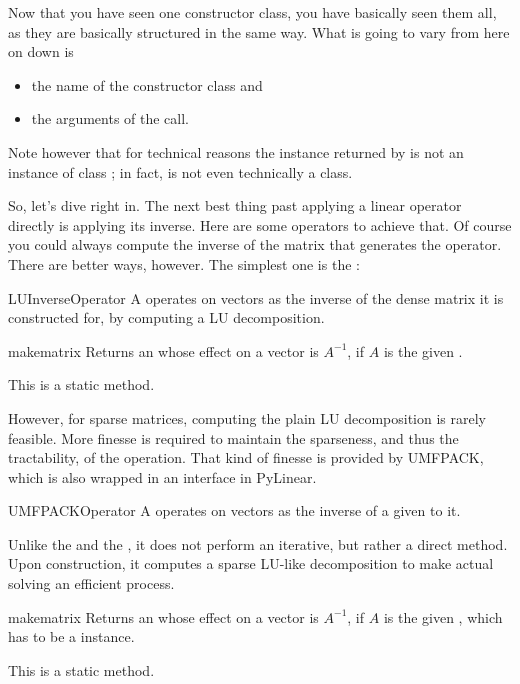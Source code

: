 Now that you have seen one constructor class, you have basically
seen them all, as they are basically structured in the same way.
What is going to vary from here on down is
\begin{itemize}
\item the name of the constructor class and
\item the arguments of the  call.
\end{itemize}
Note however that for technical reasons the instance returned by
 is not an instance of class ; 
in fact,  is not even technically a class.

So, let's dive right in. The next best thing past applying a linear
operator directly is applying its inverse. Here are some operators to
achieve that. Of course you could always compute the inverse of the
matrix that generates the operator. There are better ways,
however. The simplest one is the :
\begin{classdesc*}{LUInverseOperator}
  A  operates on vectors as the inverse of
  the dense matrix it is constructed for, by computing a LU 
  decomposition.
\end{classdesc*}
\begin{methoddesc}{make}{matrix}
  Returns an  whose effect on a vector is $A^{-1}$,
  if $A$ is the given .

  This is a static method.
\end{methoddesc}
However, for sparse matrices, computing the plain LU decomposition is
rarely feasible. More finesse is required to maintain the sparseness,
and thus the tractability, of the operation. That kind of finesse is
provided by UMFPACK, which is also wrapped in an 
interface in PyLinear.
\begin{classdesc*}{UMFPACKOperator}
  A  operates on vectors as the inverse of a
   given to it.

  Unlike the  and the ,
  it does not perform an iterative, but rather a direct method.
  Upon construction, it computes a sparse LU-like decomposition 
  to make actual solving an efficient process.
\end{classdesc*}
\begin{methoddesc}{make}{matrix}
  Returns an  whose effect on a vector is $A^{-1}$,
  if $A$ is the given , which has to be a 
   instance.

  This is a static method.
\end{methoddesc}
